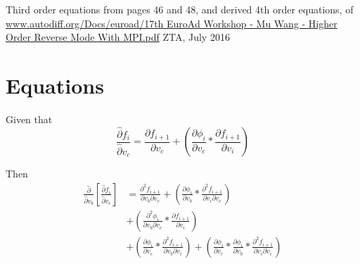 \documentclass[12pt,letter]{article}
\begin{document}
	\thispagestyle{empty}
	\begin{center}
	Third order equations from pages 46 and 48, and derived 4th order equations, of
	\url{www.autodiff.org/Docs/euroad/17th EuroAd Workshop - Mu Wang - Higher Order Reverse Mode With MPI.pdf}
	ZTA, July 2016
	\end{center}
	\clearpage
	
	\newpage
	\section{Equations}
	Given that
	\begin{equation}
	\frac{\hat{\partial} f_i}{\hat{\partial} v_c} = 
	\frac{\partial f_{i+1}}{\partial v_c} + 
	\left(\frac{\partial \phi_i}{\partial v_c} * \frac{\partial f_{i+1}}{\partial v_i}\right)
	\end{equation}
	
	Then
	\begin{equation}
	\begin{split}
	\frac{\hat{\partial}}{\hat{\partial} v_b}\left[\frac{\hat{\partial} f_i}{\hat{\partial} v_c}\right]
	&=
	\frac{\partial^2 f_{i+1}}{\partial v_b \partial v_c} +
	\left(\frac{\partial\phi_i}{\partial v_b} * \frac{\partial^2 f_{i+1}}{\partial v_i \partial v_c}\right)
	\\
	&+
	\left(\frac{\partial^2 \phi_i}{\partial v_b \partial v_c} * \frac{\partial f_{i+1}}{\partial v_i} \right)
	\\
	&+
	\left(\frac{\partial\phi_i}{\partial v_c} * \frac{\partial^2 f_{i+1}}{\partial v_b \partial v_i}\right) +
	\left(\frac{\partial\phi_i}{\partial v_c} * \frac{\partial\phi_i}{\partial v_b} * \frac{\partial^2 f_{i+1}}{\partial v_i \partial v_i}\right)
	\end{split}
	\end{equation}
	
\end{document}
